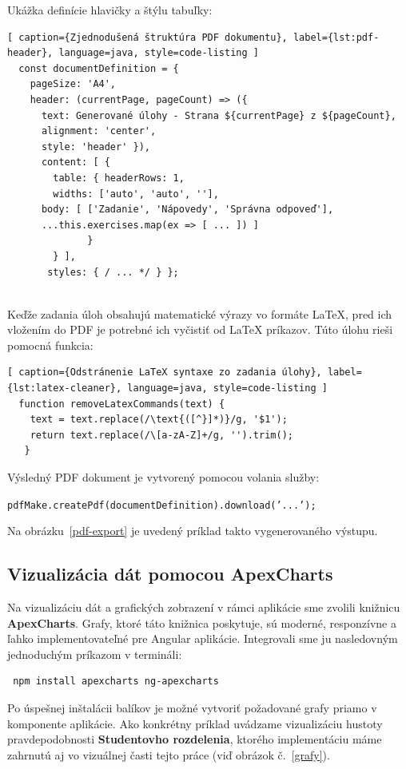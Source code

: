 Ukážka definície hlavičky a štýlu tabuľky:
 
 \begin{lstlisting}[ caption={Zjednodušená štruktúra PDF dokumentu}, label={lst:pdf-header}, language=java, style=code-listing ] 
  const documentDefinition = { 
    pageSize: 'A4', 
    header: (currentPage, pageCount) => ({ 
      text: Generované úlohy - Strana ${currentPage} z ${pageCount}, 
      alignment: 'center', 
      style: 'header' }), 
      content: [ { 
        table: { headerRows: 1, 
        widths: ['auto', 'auto', ''], 
      body: [ ['Zadanie', 'Nápovedy', 'Správna odpoveď'],
      ...this.exercises.map(ex => [ ... ]) ] 
              } 
        } ],
       styles: { / ... */ } }; 
      
      \end{lstlisting}
 
 Keďže zadania úloh obsahujú matematické výrazy vo formáte LaTeX, pred ich vložením do PDF je potrebné ich vyčistiť od LaTeX príkazov. Túto úlohu rieši pomocná funkcia:
 
 \begin{lstlisting}[ caption={Odstránenie LaTeX syntaxe zo zadania úlohy}, label={lst:latex-cleaner}, language=java, style=code-listing ] 
  function removeLatexCommands(text) { 
    text = text.replace(/\text{([^}]*)}/g, '$1');
    return text.replace(/\[a-zA-Z]+/g, '').trim(); 
   }
   \end{lstlisting}
 
 Výsledný PDF dokument je vytvorený pomocou volania služby: 
 
 \texttt{pdfMake.createPdf(documentDefinition).download('...');}
 
 Na obrázku~\ref{pdf-export} je uvedený príklad takto vygenerovaného výstupu.
\subsection{Vizualizácia dát pomocou ApexCharts}

Na vizualizáciu dát a grafických zobrazení v rámci aplikácie sme zvolili knižnicu \textbf{ApexCharts}. 
Grafy, ktoré táto knižnica poskytuje, sú moderné, responzívne a ľahko implementovateľné pre Angular aplikácie.
 Integrovali sme ju nasledovným jednoduchým príkazom v termináli: 
 
 \begin{verbatim} npm install apexcharts ng-apexcharts \end{verbatim}
 
 Po úspešnej inštalácii balíkov je možné vytvoriť požadované grafy priamo v komponente aplikácie. 
 Ako konkrétny príklad uvádzame vizualizáciu hustoty pravdepodobnosti \textbf{Studentovho rozdelenia}, ktorého implementáciu máme zahrnutú aj vo vizuálnej časti tejto práce (viď obrázok č.~\ref{grafy}).
 
